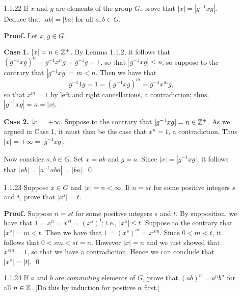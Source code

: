 \begin{enumerate}
      \textbf{Proof.} Suppose that $n$ is odd. We can then write $n = 2k + 1$
      for some nonnegative integer $k$. Since $|x| = n$, we have that
      $xx^{2k} = x^{2k+1} = 1 = x^{-2k}x^{2k}$, so that by right cancellation,
      we can conclude that $x = x^{-2k} = (x^2)^{-k}$. \qed
   \item[1.1.22]  If $x$ and $g$ are elements of the group $G$, prove that
                  $|x| = |g^{-1}xg|$. Deduce that $|ab| = |ba|$ for all
                  $a, b \in G$.

      \textbf{Proof.} Let $x, g \in G$.

      \textbf{Case 1.} \textit{$|x| = n \in \mathbb{Z}^+$}. By Lemma 1.1.2, it follows
      that $(g^{-1}xg)^n = g^{-1}x^ng = g^{-1}g =1$, so that $|g^{-1}xg| \le n$,
      so suppose to the contrary that $|g^{-1}xg| = m < n$. Then we have that
      $$g^{-1}1g = 1 = (g^{-1}xg)^m = g^{-1}x^mg,$$
      so that $x^m = 1$ by left and right cancellations, a contradiction; thus,  
      $|g^{-1}xg| = n = |x|$.

      \textbf{Case 2.} \textit{$|x| = +\infty$}. Suppose to the contrary that
      $|g^{-1}xg| = n \in \mathbb{Z}^+$. As we argued in Case 1, it must then be the 
      case that $x^n = 1$, a contradiction. Thus $|x| = +\infty = |g^{-1}xg|$.

      Now consider $a, b \in G$. Set $x = ab$ and $g = a$. Since 
      $|x| = |g^{-1}xg|$, it follows that $|ab| = |a^{-1}aba| = |ba|$. \qed
   \item[1.1.23]  Suppose $x \in G$ and $|x| = n < \infty$. If $n = st$ for some
                  positive integers $s$ and $t$, prove that $|x^s| = t$.

      \textbf{Proof.} Suppose $n = st$ for some positive integers $s$ and $t$.
      By supposition, we have that $1 = x^n = x^{st} = (x^s)^t$; i.e.,
      $|x^s| \le t$. Suppose to the contrary that $|x^s| = m < t$. Then we have
      that $1 = (x^s)^m = x^{sm}$. Since $0 < m < t$, it follows that
      $0 < sm < st = n$. However $|x| = n$ and we just showed that $x^{sm} = 1$, 
      so that we have a contradiction. Hence we can conclude that $|x^s| = |t|$.
      \qed
   \item[1.1.24]  If $a$ and $b$ are \textit{commuting} elements of $G$, prove 
                  that $(ab)^n = a^nb^n$ for all $n \in \mathbb{Z}$. [Do this by 
                  induction for positive $n$ first.]


\end{enumerate}

